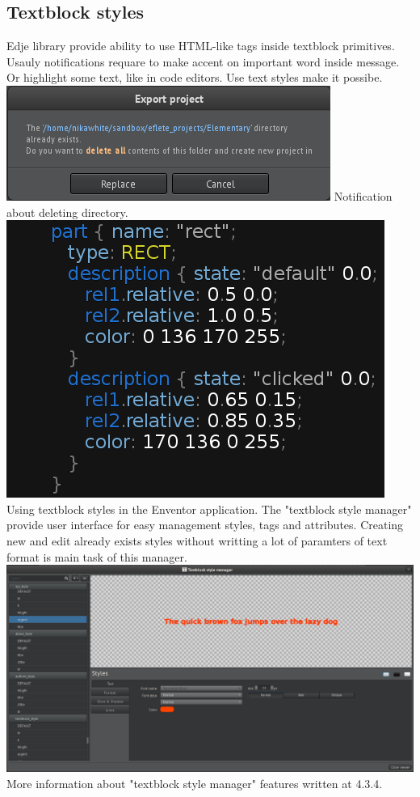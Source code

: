\documentclass[titlepage,oneside,11pt]{book}
\begin{document}
\subsection{Textblock styles}
Edje library provide ability to use HTML-like tags inside textblock primitives. Usauly notifications requare to make accent on important word inside message. Or highlight some text, like in code editors. Use text styles make it possibe.\newline
\includegraphics[scale=0.5]{images/textblock_style_example_1.png}\newline 
Notification about deleting directory.\newline
\includegraphics[scale=0.5]{images/textblock_style_example_2.png}\newline
Using textblock styles in the Enventor application.\newline
The "{}textblock style manager"{} provide user interface for easy management styles, tags and attributes. Creating new and edit already exists styles without writting a lot of paramters of text format is main task of this manager.\newline
\includegraphics[scale=0.3]{images/textblock_manager_main.png}\newline
More information about "{}textblock style manager"{} features written at 4.3.4.
\end{document}
